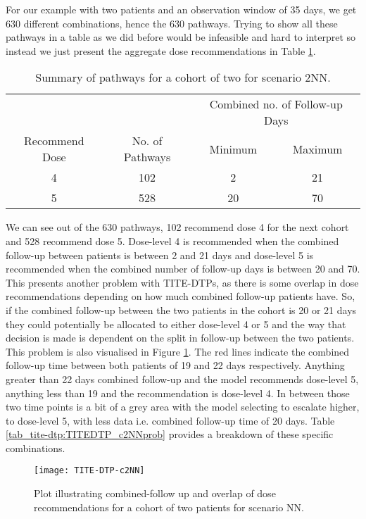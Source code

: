 For our example with two patients and an observation window of 35 days, we get 630 different combinations, hence the 630 pathways. Trying to show all these pathways in a table as we did before would be infeasible and hard to interpret so instead we just present the aggregate dose recommendations in Table \ref{tab_tite-dtp:TITEDTP_c2NN}. 

\begin{table}[H]
	\centering
	\caption{Summary of pathways for a cohort of two for scenario 2NN.}
	\label{tab_tite-dtp:TITEDTP_c2NN}
	\begin{tabular}{cccc}
		\hline
		\multicolumn{1}{l}{} & \multicolumn{1}{l}{} & \multicolumn{2}{c}{Combined no. of Follow-up Days} \\ \cline{3-4} 
		Recommend Dose & No. of Pathways & Minimum & Maximum \\ \hline
		4              & 102             & 2       & 21      \\
		5              & 528             & 20      & 70      \\ \hline
	\end{tabular}
\end{table}

We can see out of the 630 pathways, 102 recommend dose 4 for the next cohort and 528 recommend dose 5. Dose-level 4 is recommended when the combined follow-up between patients is between 2 and 21 days and dose-level 5 is recommended when the combined number of follow-up days is between 20 and 70. This presents another problem with TITE-DTPs, as there is some overlap in dose recommendations depending on how much combined follow-up patients have. So, if the combined follow-up between the two patients in the cohort is 20 or 21 days they could potentially be allocated to either dose-level 4 or 5 and the way that decision is made is dependent on the split in follow-up between the two patients. This problem is also visualised in Figure \ref{fig_tite-dtp:c2NNprob}. The red lines indicate the combined follow-up time between both patients of 19 and 22 days respectively. Anything greater than 22 days combined follow-up and the model recommends dose-level 5, anything less than 19 and the recommendation is dose-level 4. In between those two time points is a bit of a grey area with the model selecting to escalate higher, to dose-level 5, with less data i.e. combined follow-up time of 20 days. Table \ref{tab_tite-dtp:TITEDTP_c2NNprob} provides a breakdown of these specific combinations. 

\begin{figure}[h!]
	\centering
	\caption[Combined follow-up and dose decisions for a cohort of two.]{Plot illustrating combined-follow up and overlap of dose recommendations for a cohort of two patients for scenario NN.}
	\label{fig_tite-dtp:c2NNprob}
	\texttt{[image: TITE-DTP-c2NN]}
\end{figure}

